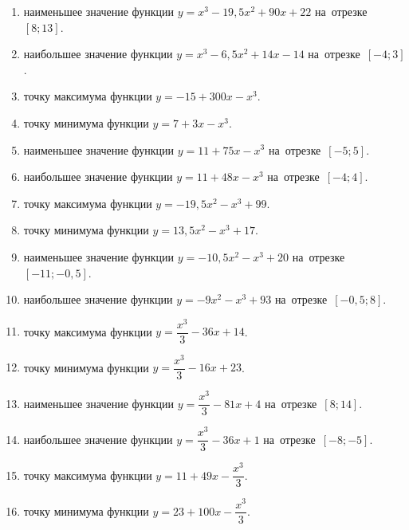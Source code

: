 \documentclass[a4paper,10pt]{article}
\begin{document}
\begin{enumerate}
\item {} наименьшее значение функции $y=x^3 -19,5x^2+90x+22$ на~отрезке~$\left[8;13\right]$.

\item {} наибольшее значение функции $y=x^3 -6,5x^2+14x-14$ на~отрезке~$\left[-4;3\right]$.

\item {} точку максимума функции $y=-15+300x-x^3$.

\item {} точку минимума функции $y=7+3x-x^3$.

\item {} наименьшее значение функции $y=11+75x-x^3$ на~отрезке~$\left[-5;5\right]$.

\item {} наибольшее значение функции $y=11+48x-x^3$ на~отрезке~$\left[-4;4\right]$.

\item {} точку максимума функции $y=-19,5x^2-x^3+99$.

\item {} точку минимума функции $y=13,5x^2-x^3+17$.

\item {} наименьшее значение функции $y=-10,5x^2-x^3+20$ на~отрезке~$\left[-11;-0,5\right]$.

\item {} наибольшее значение функции $y=-9x^2-x^3+93$ на~отрезке~$\left[-0,5;8\right]$.

\item {} точку максимума функции $y=\dfrac{x^3}{3} -36x+14$.

\item {} точку минимума функции $y=\dfrac{x^3}{3} -16x+23$.

\item {} наименьшее значение функции $y=\dfrac{x^3}{3} -81x+4$ на~отрезке~$\left[8;14\right]$.

\item {} наибольшее значение функции $y=\dfrac{x^3}{3} -36x+1$ на~отрезке~$\left[-8;-5\right]$.

\item {} точку максимума функции $y=11 +49x-\dfrac{x^3}{3}$.

\item {} точку минимума функции $y=23 +100x-\dfrac{x^3}{3}$.


\end{enumerate}
\end{document}
